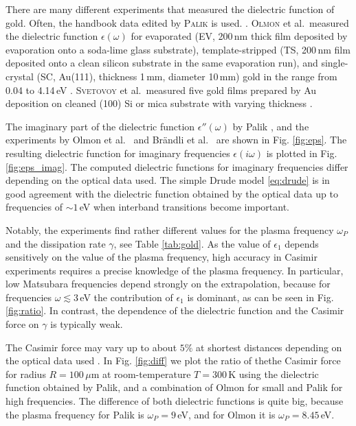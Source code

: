 \documentclass[twocolumn,superscriptaddress,pre]{revtex4-1}
\begin{document}
There are many different experiments that measured the dielectric function of
gold. Often, the handbook data edited by \textsc{Palik} is used.
\cite{Palik1995}. \textsc{Olmon} et al.\ measured the dielectric function
$\epsilon(\omega)$ for evaporated (EV, 200\,nm thick film deposited by
evaporation onto a soda-lime glass substrate), template-stripped (TS, 200\,nm
film deposited onto a clean silicon substrate in the same evaporation run), and
single-crystal (SC, Au(111), thickness 1\,mm, diameter 10\,mm) gold in the range
from 0.04 to 4.14\,eV \cite{Olmon2012}. \textsc{Svetovoy} et al.\ measured five
gold films prepared by Au deposition on cleaned (100) Si or mica substrate with
varying thickness \cite{Svetovoy2008}.

The imaginary part of the dielectric function $\epsilon''(\omega)$ by Palik
\cite{Palik1995}, and the experiments by Olmon et al.\ \cite{Olmon2012} and
Br\"andli et al.\ \cite{Brandli1972} are shown in Fig.  \ref{fig:eps}. The
resulting dielectric function for imaginary frequencies $\epsilon(i\omega)$ is
plotted in Fig. \ref{fig:eps_imag}. The computed dielectric functions for
imaginary frequencies differ depending on the optical data used. The
simple Drude model \eqref{eq:drude} is in good agreement with the dielectric
function obtained by the optical data up to frequencies of $\sim 1\,$eV when
interband transitions become important.

Notably, the experiments find rather different values for the plasma frequency
$\omega_P$ and the dissipation rate $\gamma$, see Table \ref{tab:gold}. As the
value of $\epsilon_1$ depends sensitively on the value of the plasma frequency, high
accuracy in Casimir experiments requires a precise knowledge of the plasma
frequency. In particular, low Matsubara frequencies depend strongly on the
extrapolation, because for frequencies $\omega \lesssim 3\,$eV the contribution
of $\epsilon_1$ is dominant, as can be seen in Fig. \ref{fig:ratio}. In
contrast, the dependence of the dielectric function and the Casimir force on
$\gamma$ is typically weak.

The Casimir force may vary up to about $5\%$ at shortest distances depending
on the optical data used \cite{Pirozhenko2006}.
In Fig. \ref{fig:diff} we plot the ratio
of thethe  Casimir force for radius $R=100\,\mu$m at room-temperature $T=300\,$K
using the dielectric function obtained by Palik, and a combination of Olmon for
small and Palik for high frequencies. The difference of both dielectric
functions is quite big, because the plasma frequency for Palik is
$\omega_P=9\,$eV, and for Olmon it is $\omega_P=8.45\,$eV.
\end{document}
